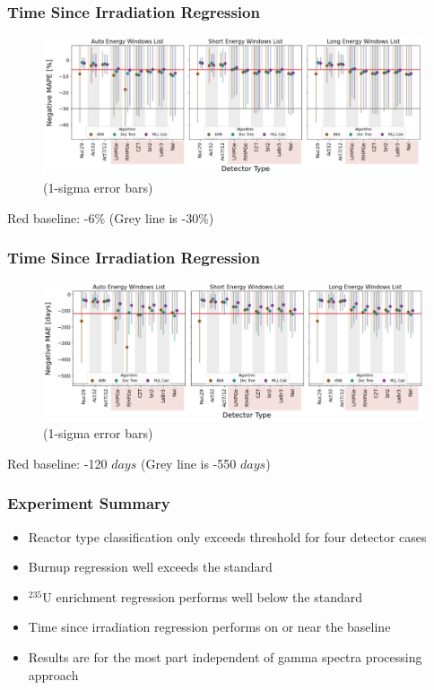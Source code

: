 \begin{frame}
  \frametitle{Time Since Irradiation Regression}
  \begin{adjustwidth}{-15pt}{-10pt}
  \begin{figure}
    \centering
    \includegraphics[width=1.1\textwidth]{./figures/detector_preds_wrt_enlist_MAPE_cool.png}
    \scriptsize (1-sigma error bars)
  \end{figure}
  \vspace{12pt} \centering Red baseline: -6\% (Grey line is -30\%) 
  \end{adjustwidth}
\end{frame}

\begin{frame}
  \frametitle{Time Since Irradiation Regression}
  \begin{adjustwidth}{-15pt}{-10pt}
  \begin{figure}
    \centering
    \includegraphics[width=1.1\textwidth]{./figures/detector_preds_wrt_enlist_MAE_cool.png}
    \scriptsize (1-sigma error bars)
  \end{figure}
  \vspace{12pt} \centering Red baseline: -120 $days$ (Grey line is -550 $days$)
  \end{adjustwidth}
\end{frame}

\begin{frame}
  \frametitle{Experiment Summary}
  \begin{itemize}
    \item Reactor type classification only exceeds threshold for four detector
    cases
    \item Burnup regression well exceeds the standard
    \item ${}^{235}\text{U}$ enrichment regression performs well below the
    standard
    \item Time since irradiation regression performs on or near the baseline
    \item Results are for the most part independent of gamma spectra processing 
    approach
  \end{itemize}
\end{frame}

